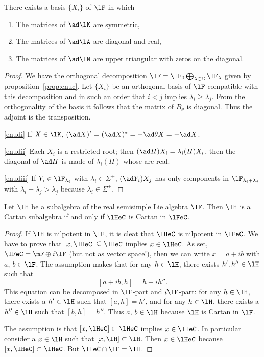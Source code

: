 \begin{lemma}
	There exists a basis $\{X_i\}$ of $\lF$ in which

	\begin{enumerate}
		\item\label{enudi} The matrices of $\ad\lK$ are symmetric,
		\item\label{enudii} The matrices of $\ad\lA$ are diagonal and real,
		\item\label{enudiii} The matrices of $\ad\lN$ are upper triangular with zeros on the diagonal.
	\end{enumerate}
\end{lemma}

\begin{proof}
	We have the orthogonal decomposition $\lF=\lF_0\bigoplus_{\lambda\in\Sigma}\lF_{\lambda}$ given by proposition~\ref{prop:enuc}. Let $\{X_i\}$ be an orthogonal basis of $\lF$ compatible with this decomposition and in such an order that $i<j$ implies $\lambda_i\geq\lambda_j$. From the orthogonality of the basis it follows that the matrix of $B_{\theta}$ is diagonal. Thus the adjoint is the transposition.

	\ref{enudi} If $X\in\lK$, $(\ad X)^t=(\ad X)^*=-\ad\theta X=-\ad X$.

	\ref{enudii} Each $X_i$ is a restricted root; then $(\ad H)X_i=\lambda_i(H)X_i$, then the diagonal of $\ad H$ is made of $\lambda_i(H)$ whose are real.

	\ref{enudiii} If $Y_i\in\lF_{\lambda_i}$ with $\lambda_i\in\Sigma^+$, $(\ad Y_i)X_j$ has only components in $\lF_{\lambda_i+\lambda_j}$ with $\lambda_i+\lambda_j>\lambda_j$ because $\lambda_i\in\Sigma^+$.
\end{proof}


\begin{lemma}
	Let $\lH$ be a subalgebra of the real semisimple Lie algebra $\lF$. Then $\lH$ is a Cartan subalgebra if and only if $\lHeC$ is Cartan in $\lFeC$.
\end{lemma}

\begin{proof}
	 If $\lH$ is nilpotent in $\lF$, it is cleat that $\lHeC$ is nilpotent in $\lFeC$. We have to prove that $[x,\lHeC]\subseteq\lHeC$ implies $x\in\lHeC$. As set, $\lFeC=\mF\oplus i\lF$  (but not as vector space!), then we can write $x=a+ib$ with $a$, $b\in\lF$. The assumption makes that for any $h\in\lH$, there exists $h',h''\in\lH$ such that
	\[
		[a+ib,h]=h+ih''.
	\]
	This equation can be decomposed in $\lF$-part and $i\lF$-part: for any $h\in\lH$, there exists a $h'\in\lH$ such that $[a,h]=h'$,  and for any $h\in\lH$, there exists a $h''\in\lH$ such that $[b,h]=h''$. Thus $a$, $b\in\lH$ because $\lH$ is Cartan in $\lF$.

	 The assumption is that $[x,\lHeC]\subset\lHeC$ implies $x\in\lHeC$. In particular consider a $x\in\lH$ such that $[x,\lH]\subset\lH$. Then $x\in\lHeC$ because $[x,\lHeC]\subset\lHeC$. But $\lHeC\cap\lF=\lH$.
\end{proof}

